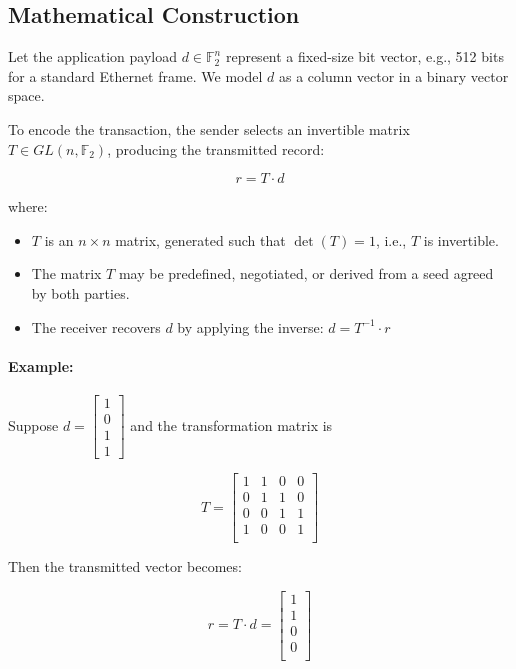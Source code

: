 \subsection{Mathematical Construction}

Let the application payload $d \in \mathbb{F}_2^n$ represent a fixed-size bit vector, e.g., 512 bits for a standard Ethernet frame. We model $d$ as a column vector in a binary vector space.

To encode the transaction, the sender selects an invertible matrix $T \in GL(n, \mathbb{F}_2)$, producing the transmitted record:

\[
r = T \cdot d
\]

\noindent where:
\begin{itemize}
  \item $T$ is an $n \times n$ matrix, generated such that $\det(T) = 1$, i.e., $T$ is invertible.
  \item The matrix $T$ may be predefined, negotiated, or derived from a seed agreed by both parties.
  \item The receiver recovers $d$ by applying the inverse: $d = T^{-1} \cdot r$
\end{itemize}

\paragraph{Example:}
Suppose $d = \begin{bmatrix} 1 \\ 0 \\ 1 \\ 1 \end{bmatrix}$ and the transformation matrix is

\[
T =
\begin{bmatrix}
1 & 1 & 0 & 0 \\
0 & 1 & 1 & 0 \\
0 & 0 & 1 & 1 \\
1 & 0 & 0 & 1 \\
\end{bmatrix}
\]

Then the transmitted vector becomes:

\[
r = T \cdot d = 
\begin{bmatrix}
1 \\
1 \\
0 \\
0 \\
\end{bmatrix}
\]

